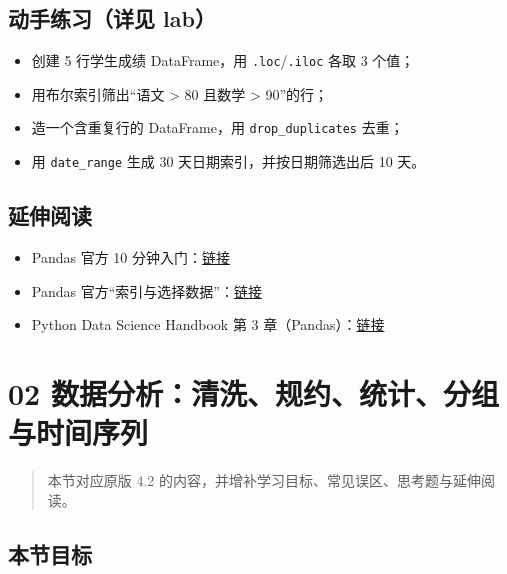 \subsection{动手练习（详见
lab）}\label{ux52a8ux624bux7ec3ux4e60ux8be6ux89c1-lab-6}

\begin{itemize}
\tightlist
\item
  创建 5 行学生成绩 DataFrame，用 \texttt{.loc}/\texttt{.iloc} 各取 3
  个值；
\item
  用布尔索引筛出``语文 \textgreater{} 80 且数学 \textgreater{}
  90''的行；
\item
  造一个含重复行的 DataFrame，用 \texttt{drop\_duplicates} 去重；
\item
  用 \texttt{date\_range} 生成 30 天日期索引，并按日期筛选出后 10 天。
\end{itemize}

\subsection{延伸阅读}\label{ux5ef6ux4f38ux9605ux8bfb-17}

\begin{itemize}
\tightlist
\item
  Pandas 官方 10
  分钟入门：\href{https://pandas.pydata.org/docs/user_guide/10min.html}{链接}
\item
  Pandas
  官方``索引与选择数据''：\href{https://pandas.pydata.org/docs/user_guide/indexing.html}{链接}
\item
  Python Data Science Handbook 第 3
  章（Pandas）：\href{https://github.com/jakevdp/PythonDataScienceHandbook}{链接}
\end{itemize}

\section{02
数据分析：清洗、规约、统计、分组与时间序列}\label{ux6570ux636eux5206ux6790ux6e05ux6d17ux89c4ux7ea6ux7edfux8ba1ux5206ux7ec4ux4e0eux65f6ux95f4ux5e8fux5217}

\begin{quote}
本节对应原版 4.2 的内容，并增补学习目标、常见误区、思考题与延伸阅读。
\end{quote}

\subsection{本节目标}\label{ux672cux8282ux76eeux6807-19}

